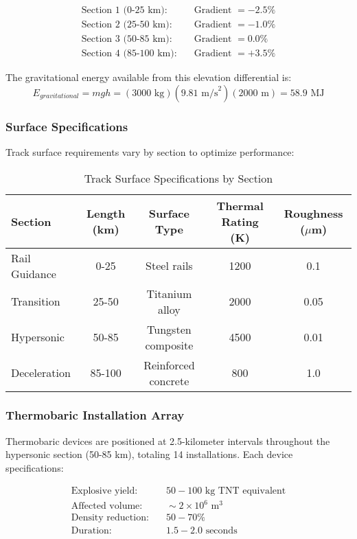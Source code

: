 \documentclass[12pt,a4paper]{article}
\begin{document}
\begin{align}
\text{Section 1 (0-25 km):} &\quad \text{Gradient } = -2.5\% \\
\text{Section 2 (25-50 km):} &\quad \text{Gradient } = -1.0\% \\
\text{Section 3 (50-85 km):} &\quad \text{Gradient } = 0.0\% \\
\text{Section 4 (85-100 km):} &\quad \text{Gradient } = +3.5\%
\end{align}

The gravitational energy available from this elevation differential is:
\begin{equation}
E_{gravitational} = mgh = (3000 \text{ kg})(9.81 \text{ m/s}^2)(2000 \text{ m}) = 58.9 \text{ MJ}
\label{eq:gravitational_energy}
\end{equation}

\subsubsection{Surface Specifications}
Track surface requirements vary by section to optimize performance:

\begin{table}[H]
\centering
\caption{Track Surface Specifications by Section}
\label{tab:track_specifications}
\begin{tabular}{lcccc}
\toprule
Section & Length (km) & Surface Type & Thermal Rating (K) & Roughness ($\mu$m) \\
\midrule
Rail Guidance & 0-25 & Steel rails & 1200 & 0.1 \\
Transition & 25-50 & Titanium alloy & 2000 & 0.05 \\
Hypersonic & 50-85 & Tungsten composite & 4500 & 0.01 \\
Deceleration & 85-100 & Reinforced concrete & 800 & 1.0 \\
\bottomrule
\end{tabular}
\end{table}

\subsubsection{Thermobaric Installation Array}
Thermobaric devices are positioned at 2.5-kilometer intervals throughout the hypersonic section (50-85 km), totaling 14 installations. Each device specifications:

\begin{align}
\text{Explosive yield:} &\quad 50-100 \text{ kg TNT equivalent} \\
\text{Affected volume:} &\quad \sim 2 \times 10^6 \text{ m}^3 \\
\text{Density reduction:} &\quad 50-70\% \\
\text{Duration:} &\quad 1.5-2.0 \text{ seconds}
\end{align}
\end{document}
